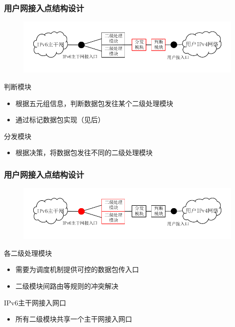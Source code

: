 \documentclass{beamer}
\begin{document}
\begin{frame}
  \frametitle{用户网接入点结构设计}
  \begin{figure}
    \includegraphics[width=\textwidth]{figs/10-user-access-point-b.pdf}
  \end{figure}
  \vspace{-1em}

  \begin{block}{判断模块}
    \begin{itemize}
    \item 根据五元组信息，判断数据包发往某个二级处理模块
    \item 通过标记数据包实现（见后）
    \end{itemize}
  \end{block}

  \begin{block}{分发模块}
    \begin{itemize}
    \item 根据决策，将数据包发往不同的二级处理模块
    \end{itemize}
  \end{block}
\end{frame}

\begin{frame}
  \frametitle{用户网接入点结构设计}
  \begin{figure}
    \includegraphics[width=\textwidth]{figs/10-user-access-point-c.pdf}
  \end{figure}
  \vspace{-1em}

  \begin{block}{各二级处理模块}
    \begin{itemize}
    \item 需要为调度机制提供可控的数据包传入口
    \item 二级模块间路由等规则的冲突解决
    \end{itemize}
  \end{block}

  \begin{block}{IPv6主干网接入网口}
    \begin{itemize}
    \item 所有二级模块共享一个主干网接入网口
    \end{itemize}
  \end{block}
\end{frame}
\end{document}

